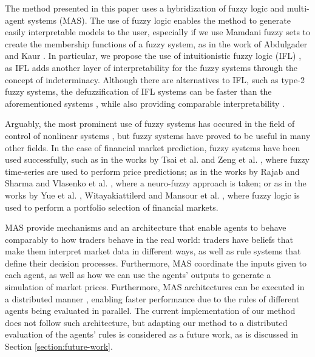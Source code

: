 \documentclass{ieeeaccess}
\begin{document}
The method presented in this paper uses a hybridization of fuzzy logic
and multi-agent systems (MAS). The use of fuzzy logic enables
the method to generate easily interpretable models to the user,
especially if we use Mamdani fuzzy sets \cite{Mamdani1975} 
to create the membership functions of a fuzzy system, as in the
work of Abdulgader and Kaur \cite{Abdulgader2019}. 
In particular, we propose the use of intuitionistic fuzzy logic (IFL)
\cite{Atanassov1986} \cite{Atanassov2003}, as IFL adds another layer
of interpretability for the fuzzy systems through the concept of
indeterminacy. Although there are alternatives to IFL, such as type-2
fuzzy systems, the defuzzification of IFL systems can be faster than
the aforementioned systems \cite{Hernandez-Aguila2017-2}, while also
providing comparable interpretability \cite{Hernandez-Aguila2016} \cite{castillo2019comments}.

Arguably, the most prominent use of fuzzy systems has occured in the
field of control of nonlinear systems \cite{sun2020event}
\cite{sun2020fuzzy}, but fuzzy systems have proved to be useful in
many other fields. In the case of financial market prediction, fuzzy
systems have been used successfully,
such as in the works by Tsai et al. \cite{Tsai2019} and Zeng et
al. \cite{Zeng2019}, where fuzzy time-series are used to perform price
predictions; as in the works by Rajab and Sharma \cite{Rajab2019} and
Vlasenko et al. \cite{Vlasenko2019}, where a neuro-fuzzy approach is
taken; or as in the works by Yue et al. \cite{Yue2019},
Witayakiattilerd \cite{Witayakiattilerd2019} and Mansour et
al. \cite{Mansour2019}, where fuzzy logic is used to perform a
portfolio selection of financial markets.

MAS provide mechanisms and an architecture that enable agents to
behave comparably to how traders behave in the real world: traders have
beliefs that make them interpret market data in different ways, as
well as rule systems that define their decision
processes. Furthermore, MAS coordinate the inputs given to each agent,
as well as how we can use the agents' outputs to generate a simulation
of market prices.
Furthermore, MAS architectures can be executed in a distributed manner
\cite{Gao2019} \cite{Yu2015}, enabling faster
performance due to the rules of different agents being evaluated in
parallel. The current implementation of our method does not follow such architecture, but
adapting our method to a distributed evaluation of the agents' rules
is considered as a future work, as is discussed in Section
\ref{section:future-work}.
\end{document}
